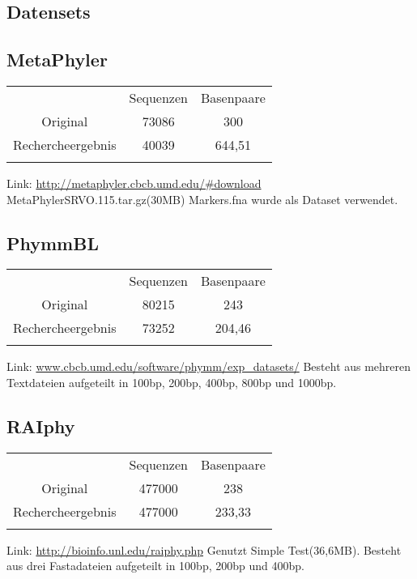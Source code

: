 \documentclass[a4paper, 11pt]{scrartcl}
\begin{document}
\begin{flushleft}


\section{Datensets}


\subsection{MetaPhyler}

\begin{tabular}{ccc}
& Sequenzen & Basenpaare \\
Original&73086&300\\
Rechercheergebnis&40039&644,51\\
&&\\
\end{tabular}
\linebreak
\color{red}
Link: \url{http://metaphyler.cbcb.umd.edu/#download}
\linebreak
MetaPhylerSRVO.115.tar.gz(30MB)
\linebreak
Markers.fna wurde als Dataset verwendet.
\color{black}
\subsection{PhymmBL}

\begin{tabular}{ccc}
& Sequenzen & Basenpaare \\
Original&80215&243\\
Rechercheergebnis&73252&204,46\\
&&\\
\end{tabular}
\linebreak
\color{red}
Link: \url{www.cbcb.umd.edu/software/phymm/exp_datasets/}
\linebreak
Besteht aus mehreren Textdateien aufgeteilt in 100bp, 200bp, 400bp, 800bp und 1000bp.
\color{black}

\subsection{RAIphy}
\begin{tabular}{ccc}
& Sequenzen & Basenpaare \\
Original&477000&238\\
Rechercheergebnis&477000&233,33\\
&&\\
\end{tabular}
\linebreak
\color{red}
Link: \url{http://bioinfo.unl.edu/raiphy.php}
\linebreak
Genutzt Simple Test(36,6MB).
\linebreak
Besteht aus drei Fastadateien aufgeteilt in 100bp, 200bp und 400bp.
\color{black}


\end{flushleft}
\end{document}
